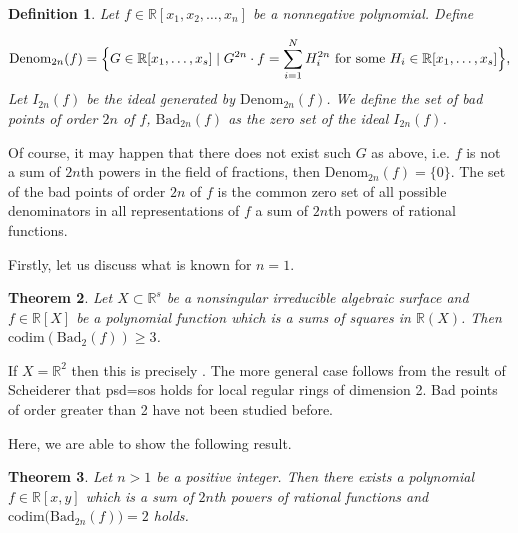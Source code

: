 \documentclass[12pt,reqno]{amsart}   	%
\newtheorem{thm}{Theorem}[section]
\newtheorem{df}[thm]{Definition}
\theoremstyle{remark}
\newcommand{\R}{\mathbb{R}}
\begin{document}
\begin{df}
Let $f \in \R[x_1,x_2,\dots, x_n]$ be a nonnegative polynomial. Define


        \begin{align*}
        \mathrm{Denom}_{2n}(f) &= \Bigl\{ G \in \mathbb{R}[x_1,\dots, x_s]  \mid G^{2n} \cdot f = \sum_{i =1}^N H_i^{2n} \text{ for some } H_i \in \R[x_1,\dots, x_s] \Bigr\}, \\   
        \end{align*}
Let $I_{2n}(f)$ be the ideal generated by $\mathrm{Denom}_{2n}(f)$. We define the set of bad points of order $2n$ of $f$, $\mathrm{Bad}_{2n}(f)$ as the zero set of the ideal $I_{2n}(f)$.



        
\end{df}
Of course, it may happen that there does not exist such $G$ as above, i.e. $f$ is not a sum of $2n$th powers in the field of fractions, then $\mathrm{Denom}_{2n}(f)=\{0\}$. The set of the bad points of order $2n$ of $f$ is the common zero set of all possible denominators in all representations of $f$ a sum of $2n$th powers of rational functions.


Firstly, let us discuss what is known for $n=1$.

\begin{thm}
    Let $X \subset \R^s$ be a nonsingular irreducible algebraic surface and $f \in \R[X]$ be a polynomial function which is a sums of squares in $\R(X)$. Then $\mathrm{codim}(\mathrm{Bad}_2(f)) \geq 3$.
\end{thm}
If $X=\R^2$ then this is precisely \cite[Proposition 5.1]{delzellPhd}. The more general case follows from the result of Scheiderer \cite[Theorem 4.8]{scheiderer2001} that psd=sos holds for local regular rings of dimension 2. Bad points of order greater than 2 have not been studied before. 

Here, we are able to show the following result.




\begin{thm} \label{THM: Bad_2k może mieć codim 2 dla k>1}
   Let $n>1$ be a positive integer. Then there exists a polynomial $f \in \R[x,y]$ which is a sum of $2n$th powers of rational functions and $\mathrm{codim}\big(\mathrm{Bad}_{2n}(f)\big) = 2$ holds.
\end{thm}
\end{document}
